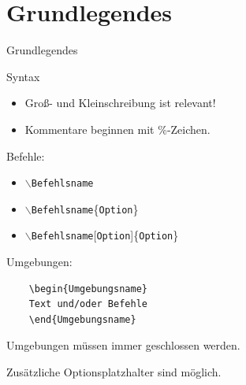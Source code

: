 \documentclass{beamer}
\begin{document}
\section{Grundlegendes}
\begin{frame}
\centering
\huge{Grundlegendes}
\end{frame}


\begin{frame}[fragile]{Syntax}

\begin{itemize}
\item Groß- und Kleinschreibung ist relevant!
\item Kommentare beginnen mit \%-Zeichen.
\end{itemize}

\begin{block}{Befehle:}

\begin{itemize}
\item $\backslash$\texttt{Befehlsname}
\item $\backslash$\texttt{Befehlsname}\{\texttt{Option}\}
\item $\backslash$\texttt{Befehlsname}[\texttt{Option}]\{\texttt{Option}\}
\end{itemize}
\end{block}

\begin{block}{Umgebungen:}
\begin{verbatim}
	\begin{Umgebungsname}
	Text und/oder Befehle
	\end{Umgebungsname}
\end{verbatim}

Umgebungen müssen immer geschlossen werden.

Zusätzliche Optionsplatzhalter sind möglich.

\end{block}


\end{frame}
\end{document}
